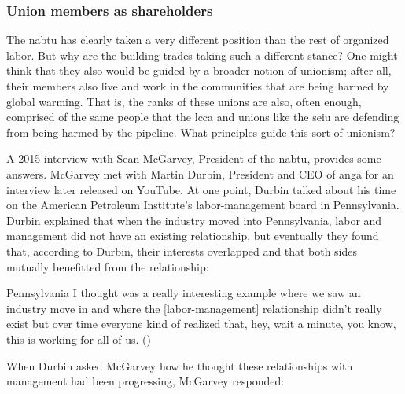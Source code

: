 \documentclass[12pt]{article}
\renewenvironment{quote}
  {\list{}{\leftmargin=\parindent\rightmargin=0pt}%
   \item\relax}
  {\endlist}
\begin{document}
\subsubsection{Union members as shareholders}

The \acrfull{nabtu} has clearly taken a very different position than the rest of organized labor. But why are the building trades taking such a different stance? One might think that they also would be guided by a broader notion of unionism; after all, their members also live and work in the communities that are being harmed by global warming. That is, the ranks of these unions are also, often enough, comprised of the same people that the \acrshort{lcca} and unions like the \acrshort{seiu} are defending from being harmed by the pipeline. What principles guide this sort of unionism?

A 2015 interview with Sean McGarvey, President of the \acrshort{nabtu}, provides some answers. McGarvey met with Martin Durbin, President and CEO of \acrfull{anga} for an interview later released on YouTube. At one point, Durbin talked about his time on the American Petroleum Institute’s labor-management board in Pennsylvania. Durbin explained that when the industry moved into Pennsylvania, labor and management did not have an existing relationship, but eventually they found that, according to Durbin, their interests overlapped and that both sides mutually benefitted from the relationship:

\begin{quote}
Pennsylvania I thought was a really interesting example where we saw an industry move in and where the [labor-management] relationship didn't really exist but over time everyone kind of realized that, hey, wait a minute, you know, this is working for all of us. (\cite{natgasnowNextInfrastructureChallenge2015})
\end{quote}

\noindent{}When Durbin asked McGarvey how he thought these relationships with management had been progressing, McGarvey responded:
\end{document}
